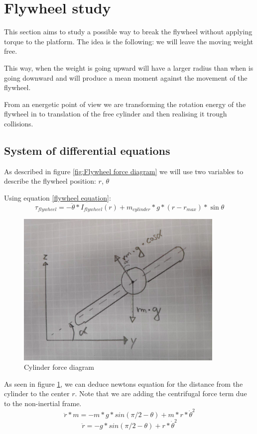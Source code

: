 \section{Flywheel study}

This section aims to study a possible way to break the flywheel without applying torque to the platform. The idea is the following: we will leave the moving weight free.

This way, when the weight is going upward will have a larger radius than when is going downward and will produce a mean moment against the movement of the flywheel.

From an energetic point of view we are transforming the rotation energy of the flywheel in to translation of the free cylinder and then realising it trough collisions.
\subsection{System of differential equations}
As described in figure \ref{fig:Flywheel force diagram} we will use two variables to describe the flywheel position: $r$, $\theta$ 

Using equation \ref{flywheel equation}:
\[\tau_{flywheel} = -\ddot{\theta}*I_{flywheel}(r) + m_{cylinder} * g * (r - r_{max}) * \sin{\theta}\]
\begin{figure}[ht]
	\centering
	\includegraphics[width=10cm]{img/cylinder_forces.png}
	\caption{Cylinder force diagram}
	\label{fig:Cylinder force diagram}
\end{figure}

As seen in figure \ref{fig:Cylinder force diagram}, we can deduce newtons equation for the distance from the cylinder to the center $r$. Note that we are adding the centrifugal force term due to the non-inertial frame.
\[\ddot{r} * m = -m * g * sin(\pi/2-\theta) + m * r * \dot{\theta}^2 \]
\[\ddot{r} = -g * sin(\pi/2-\theta) + r * \dot{\theta}^2 \]

